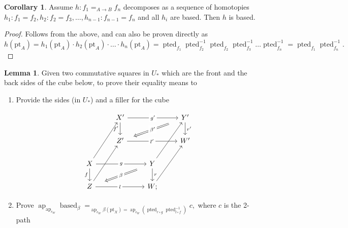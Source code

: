 \documentclass{amsart}
\theoremstyle{definition}
\newtheorem{cor}[theorem]{Corollary}
\newtheorem{lem}[theorem]{Lemma}
\newcommand{\ap}{\operatorname{ap}}
\newcommand{\bs}[1]{\mathrm{pt}_{#1}}
\newcommand{\ptd}[1]{\operatorname{pted}_{#1}}
\newcommand{\bsd}[1]{\operatorname{based}_{#1}}
\begin{document}
\begin{cor}\label{cor:comp_of_based}
    Assume $h: f_1 =_{A \to B} f_n$ decomposes as a sequence of homotopies $h_1 : f_1=f_2, h_2: f_2 = f_3, \ldots, h_{n-1}: f_{n-1} = f_n$ and all $h_i$ are based. Then $h$ is based.
\end{cor}

\begin{proof}
    Follows from the above, and can also be proven directly as
    $h(\bs{A}) = h_1(\bs{A}) \cdot h_2(\bs{A}) \cdot \ldots \cdot h_n(\bs{A}) = \ptd{f_1} \ptd{f_2}^{-1} \ptd{f_2} \ptd{f_3}^{-1} \ldots \ptd{f_n}^{-1} = \ptd{f_1} \ptd{f_n}^{-1}.$
\end{proof}

\begin{lem}\label{equality-of-squares}
    Given two commutative squares in $U_*$ which are the front and the back sides of the cube below, to prove their equality means to
    \begin{enumerate}
        \item Provide the sides (in $U_*$) and a filler for the cube

\[\begin{tikzcd}
	& {X'} && {Y'} \\
	& {Z'} && {W'} \\
	X && Y \\
	Z && {W;}
	\arrow["{g'}"{description}, from=1-2, to=1-4]
	\arrow["{f'}"', from=1-2, to=2-2]
	\arrow["{\beta'}"{description}, shorten <=14pt, shorten >=10pt, Rightarrow, from=1-4, to=2-2]
	\arrow["{r'}", from=1-4, to=2-4]
	\arrow["{l'}"{description}, from=2-2, to=2-4]
	\arrow[from=3-1, to=1-2]
	\arrow["g"{description}, from=3-1, to=3-3]
	\arrow["f"', from=3-1, to=4-1]
	\arrow[from=3-3, to=1-4]
	\arrow["\beta"{description}, shorten <=14pt, shorten >=14pt, Rightarrow, from=3-3, to=4-1]
	\arrow["r", from=3-3, to=4-3]
	\arrow[from=4-1, to=2-2]
	\arrow["l"{description}, from=4-1, to=4-3]
	\arrow[from=4-3, to=2-4]
\end{tikzcd}\]
        \item Prove $\ap_{\ap_{e_W}}\bsd{\beta} =_{\ap_{e_W}{\beta(\bs{X})} = \ap_{e_W} (\ptd{r \circ g} \ptd{l \circ f}^{-1})} c,$
    where $c$ is the 2-path


    \end{enumerate}


\end{lem}
\end{document}

